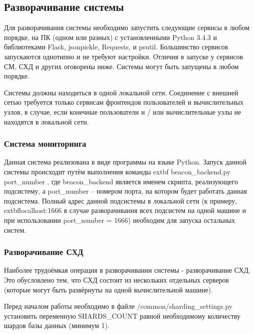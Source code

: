 \documentclass[a4paper,12pt]{report}
\numberwithin{equation}{section}
\begin{document}
  \subsection{Разворачивание системы}
  Для разворачивания системы необходимо запустить следующие сервисы в любом порядке, 
  на ПК (одном или разных) с установленными Python 3.4.3 и библиотеками Flask, jsonpickle, Requests, и psutil. 
  Большинство сервисов запускаются однотипно и не требуют настройки. 
  Отличия в запуске у сервисов СМ, СХД и других оговорены ниже.
  Системы могут быть запущены в любом порядке.
  
  Системы должны находиться в одной локальной сети. 
  Соединение с внешней сетью требуется только сервисам фронтендов пользователей и вычислительных узлов, 
  в случае, если конечные пользователи и / или вычислительные узлы не находятся в локальной сети.
  
  \subsubsection{Система мониторинга}
  Данная система реализована в виде программы на языке Python.
  Запуск данной системы происходит путём выполнения команды 
  extbf{ beacon\_backend.py port\_number }
  , где beacon\_backend является именем скрипта, реализующего подсистему, 
  а port\_number -- номером порта, на котором будет работать данная подсистема.
  Полный адрес данной подсистемы в локальной сети (к примеру, 
  extbf{localhost:1666} в случае разворачивания всех подсистем на одной машине 
  и при использовании port\_number = 1666)
  необходим для запуска остальных систем.  
  
  \subsubsection{Разворачивание СХД}
  Наиболее трудоёмкая операция в разворачивании системы - разворачивание СХД. 
  Это обусловлено тем, что СХД состоит из нескольких отдельных серверов (которые могут быть развёрнуты на одной вычислительной машине).
  
  Перед началом работы необходимо в файле /common/sharding\_settings.py установить переменную SHARDS\_COUNT равной необходимому количеству шардов базы данных (минимум 1).
  
\end{document}
